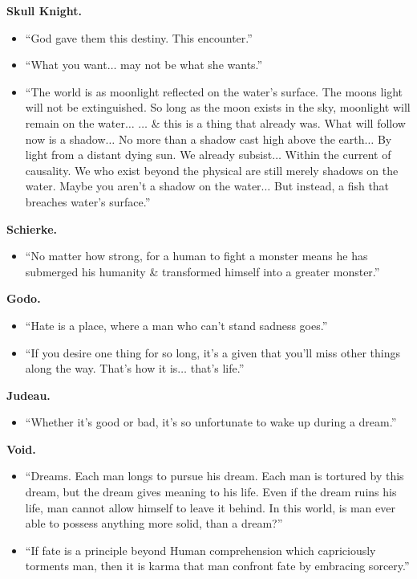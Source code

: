 \documentclass{article}
\begin{document}
\begin{enumerate}
\begin{itemize}
	\end{itemize}
	{\bf Skull Knight.}
	\begin{itemize}
		\item ``God gave them this destiny. This encounter.''
		\item ``What you want$\ldots$ may not be what she wants.''
		\item ``The world is as moonlight reflected on the water's surface. The moons light will not be extinguished. So long as the moon exists in the sky, moonlight will remain on the water$\ldots$ $\ldots$ \& this is a thing that already was. What will follow now is a shadow$\ldots$ No more than a shadow cast high above the earth$\ldots$ By light from a distant dying sun. We already subsist$\ldots$ Within the current of causality. We who exist beyond the physical are still merely shadows on the water. Maybe you aren't a shadow on the water$\ldots$ But instead, a fish that breaches water's surface.''
	\end{itemize}
	{\bf Schierke.}
	\begin{itemize}
		\item ``No matter how strong, for a human to fight a monster means he has submerged his humanity \& transformed himself into a greater monster.''
	\end{itemize}
	{\bf Godo.}
	\begin{itemize}
		\item ``Hate is a place, where a man who can't stand sadness goes.''
		\item ``If you desire one thing for so long, it's a given that you'll miss other things along the way. That's how it is$\ldots$ that's life.''
	\end{itemize}
	{\bf Judeau.}
	\begin{itemize}
		\item ``Whether it's good or bad, it's so unfortunate to wake up during a dream.''
	\end{itemize}
	{\bf Void.}
	\begin{itemize}
		\item ``Dreams. Each man longs to pursue his dream. Each man is tortured by this dream, but the dream gives meaning to his life. Even if the dream ruins his life, man cannot allow himself to leave it behind. In this world, is man ever able to possess anything more solid, than a dream?''
		\item ``If fate is a principle beyond Human comprehension which capriciously torments man, then it is karma that man confront fate by embracing sorcery.''

\end{itemize}
\end{enumerate}
\end{document}
